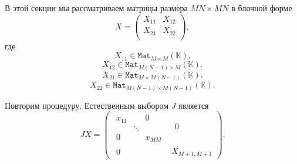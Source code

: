 \documentclass[14pt,a4paper]{extarticle}
\numberwithin{equation}{section}
\theoremstyle{definition}
\begin{document}
В этой секции мы рассматриваем матрицы размера
    \( {MN}{\times}{MN} \)
    в блочной форме
    \[
    X =
        \left(\begin{array}{c|c}
              X_{11} & X_{12} \\ \hline
              X_{21} & X_{22} \\
        \end{array}\right),
    \]
где
\[ X_{11} \in \mathtt{Mat}_{M{\times}M}(\mathbb{K}).\]
\[ X_{12} \in \mathtt{Mat}_{M(N-1){\times}M}(\mathbb{K}).\]
\[ X_{21} \in \mathtt{Mat}_{M{\times}M(N-1)}(\mathbb{K}).\]
\[ X_{22} \in \mathtt{Mat}_{M(N-1){\times}M(N-1)}(\mathbb{K}).\]

Повторим процедуру.
Естественным выбором \( J \) является
\[
        J X =
        \left(\begin{array}{c|c}
            \begin{matrix}
                x_{11} &  & 0 \\
                 & \ddots &  \\
                0 &  & x_{MM}
            \end{matrix} &
            \begin{matrix}
                0 \\
            \end{matrix} \\ \hline
            \begin{matrix}
                0 &
            \end{matrix} &
            X_{M+1,M+1}
        \end{array}\right).
\]
\end{document}
